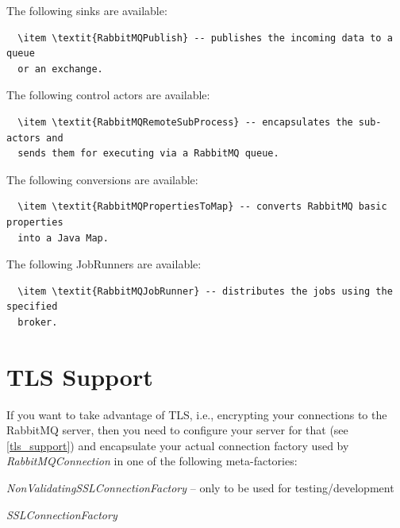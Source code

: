 \documentclass[a4paper]{book}
\begin{document}
The following sinks are available:
\begin{verbatim}
  \item \textit{RabbitMQPublish} -- publishes the incoming data to a queue
  or an exchange.
\end{verbatim}

The following control actors are available:
\begin{verbatim}
  \item \textit{RabbitMQRemoteSubProcess} -- encapsulates the sub-actors and
  sends them for executing via a RabbitMQ queue.
\end{verbatim}

The following conversions are available:
\begin{verbatim}
  \item \textit{RabbitMQPropertiesToMap} -- converts RabbitMQ basic properties
  into a Java Map.
\end{verbatim}

The following JobRunners are available:
\begin{verbatim}
  \item \textit{RabbitMQJobRunner} -- distributes the jobs using the specified
  broker.
\end{verbatim}

\section{TLS Support}
If you want to take advantage of TLS, i.e., encrypting your connections to
the RabbitMQ server, then you need to configure your server for that (see
\ref{tls_support}) and encapsulate your actual connection factory used by
\textit{RabbitMQConnection} in one of the following meta-factories:
\begin{tight_itemize}
  \item \textit{NonValidatingSSLConnectionFactory} -- only to be used for testing/development
  \item \textit{SSLConnectionFactory}
\end{tight_itemize}



\end{document}
